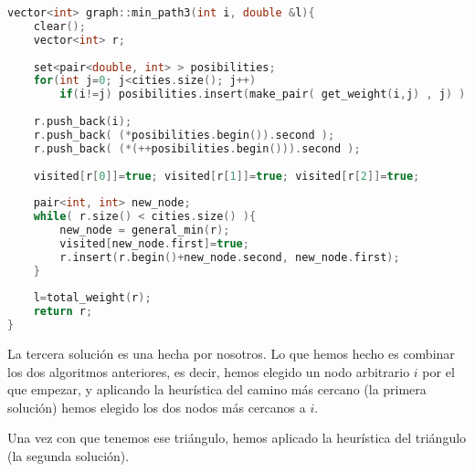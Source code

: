 \documentclass[11pt]{article}
\begin{document}
\begin{lstlisting}[language=C++, caption=min\_path3]
vector<int> graph::min_path3(int i, double &l){
	clear();  
	vector<int> r;
	
	set<pair<double, int> > posibilities;
	for(int j=0; j<cities.size(); j++)
		if(i!=j) posibilities.insert(make_pair( get_weight(i,j) , j) );
	
	r.push_back(i);
	r.push_back( (*posibilities.begin()).second );
	r.push_back( (*(++posibilities.begin())).second );
	
	visited[r[0]]=true; visited[r[1]]=true; visited[r[2]]=true;
	
	pair<int, int> new_node;
	while( r.size() < cities.size() ){
		new_node = general_min(r);
		visited[new_node.first]=true;
		r.insert(r.begin()+new_node.second, new_node.first);    
	}
	
	l=total_weight(r);
	return r;
}
\end{lstlisting}

La tercera solución es una hecha por nosotros. Lo que hemos hecho es combinar los dos algoritmos anteriores, es decir, hemos elegido un nodo arbitrario $i$ por el que empezar, y aplicando la heurística del camino más cercano (la primera solución) hemos elegido los dos nodos más cercanos a $i$.

Una vez con que tenemos ese triángulo, hemos aplicado la heurística del triángulo (la segunda solución).
\end{document}
